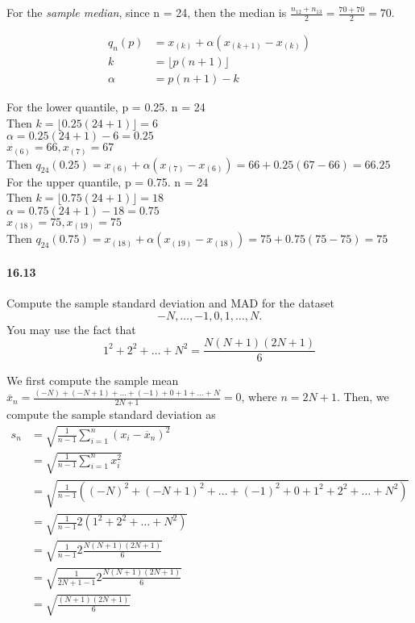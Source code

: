 \documentclass{article} %
\begin{document}
For the {\it sample median}, since n = 24, then the median is $\frac{n_{12}+n_{13}}{2} = \frac{70+70}{2} = 70$. 

\begin{align*}
q_n(p) & =  x_{(k)} + \alpha \left( x_{(k+1)} - x_{(k)}\right) \\
k & = \lfloor p(n+1) \rfloor \\
\alpha & = p(n+1) - k
\end{align*}

For the lower quantile, p = 0.25. n = 24 \\
Then $k = \lfloor 0.25(24 + 1) \rfloor  = 6$\\
$\alpha = 0.25(24+1)-6 = 0.25$\\
$x_(6) = 66, x_(7) = 67$\\
Then $q_{24}(0.25) = x_{(6)} + \alpha \left( x_{(7)} - x_{(6)}\right) = 66 + 0.25 (67 - 66) = 66.25$\\

For the upper quantile, p = 0.75. n = 24 \\
Then $k = \lfloor 0.75(24 + 1) \rfloor  = 18$\\
$\alpha = 0.75(24+1)-18 = 0.75$\\
$x_(18) = 75, x_(19) = 75$\\
Then $q_{24}(0.75) = x_{(18)} + \alpha \left( x_{(19)} - x_{(18)}\right) = 75 + 0.75 (75 - 75) = 75$\\


\paragraph*{16.13} Compute the sample standard deviation and MAD for the dataset 
$$
-N, \ldots, -1, 0, 1, \ldots, N. 
$$
You may use the fact that 
$$
1^2 + 2^2 + \ldots + N^2 = \frac{N(N+1)(2N+1)}{6}
$$

We first compute the sample mean $\overline{x}_n = \frac{(-N) + (-N+1) + \ldots + (-1) + 0 + 1 + \ldots + N}{2N + 1} = 0$, where $n = 2N + 1$.
Then, we compute the sample standard deviation as
\begin{align*}
s_n  &= \sqrt{\frac{1}{n-1}\sum_{i=1}^n\left(x_i - \overline{x}_n \right)^2}\\
& = \sqrt{\frac{1}{n-1}\sum_{i=1}^n x_i ^2} \\
& = \sqrt{\frac{1}{n-1}\left((-N)^2 + (-N+1)^2 + \ldots + (-1)^2 + 0 + 1^2 + 2^2 + \ldots + N^2 \right) }\\
& = \sqrt{\frac{1}{n-1}2\left(1^2 + 2^2 + \ldots + N^2 \right) } \\
& =  \sqrt{\frac{1}{n-1}2\frac{N(N+1)(2N+1)}{6} } \\
& = \sqrt{\frac{1}{2N+1 - 1}2 \frac{N(N+1)(2N+1)}{6}}\\
& = \sqrt{\frac{(N+1)(2N+1)}{6}}
\end{align*}
\end{document}
